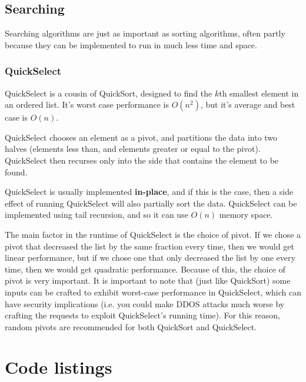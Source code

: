 \subsection{Searching}

Searching algorithms are just as important as sorting algorithms, often partly
because they can be implemented to run in much less time and space.

\subsubsection{QuickSelect}
\label{QuickSelect}

QuickSelect is a cousin of QuickSort, designed to find the $k$th smallest
element in an ordered list. It's worst case performance is $O(n^2)$, but it's
average and best case is $O(n)$.

QuickSelect chooses an element as a pivot, and partitions the data into two
halves (elements less than, and elements greater or equal to the pivot).
QuickSelect then recurses only into the side that contains the element to be
found.

QuickSelect is usually implemented \textbf{in-place}, and if this is the case,
then a side effect of running QuickSelect will also partially sort the data.
QuickSelect can be implemented using tail recursion, and so it can use $O(n)$
memory space.

The main factor in the runtime of QuickSelect is the choice of pivot. If we
chose a pivot that decreased the list by the same fraction every time, then we
would get linear performance, but if we chose one that only decreased the list
by one every time, then we would get quadratic performance. Because of this, the
choice of pivot is very important. It is important to note that (just like
QuickSort) some inputs can be crafted to exhibit worst-case performance in
QuickSelect, which can have security implications (i.e. you could make DDOS
attacks much worse by crafting the requests to exploit QuickSelect's running
time). For this reason, random pivots are recommended for both QuickSort and
QuickSelect.



\section{Code listings}



